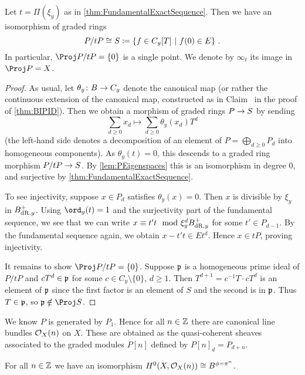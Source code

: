 \begin{cor}\label{cor:P/tPpoint}
	Let $t=\Pi(\xi_y)$ as in \cref{thm:FundamentalExactSequence}. Then we have an isomorphism of graded rings
	\begin{equation*}
		P/tP\cong S\coloneqq\left\{f\in C_y[T]\ \middle|\  f(0)\in E\right\}\,.
	\end{equation*}
	In particular, $\Proj P/tP=\{0\}$ is a single point. We denote by $\infty_t$ its image in $\Proj P=X$.
\end{cor}
\begin{proof}
	As usual, let $\theta_y\colon B\morphism C_y$ denote the canonical map (or rather the continuous extension of the canonical map, constructed as in Claim~ in the proof of \cref{thm:BIPID}). Then we obtain a morphism of graded rings $P\morphism S$ by sending
	\begin{equation*}
		\sum_{d\geq 0}x_d\longmapsto \sum_{d\geq 0}\theta_y(x_d)T^d
	\end{equation*}
	(the left-hand side denotes a decomposition of an element of $P=\bigoplus_{d\geq 0}P_d$ into homogeneous components). As $\theta_y(t)=0$, this descends to a graded ring morphism $P/tP\morphism S$. By \cref{lem:PEigenspaces} this is an isomorphism in degree $0$, and surjective by \cref{thm:FundamentalExactSequence}.
	
	To see injectivity, suppose $x\in P_d$ satisfies $\theta_y(x)=0$. Then $x$ is divisible by $\xi_y$ in $B_{\mathrm{dR},y}^+$. Using $\ord_y(t)=1$ and the surjectivity part of the fundamental sequence, we see that we can write $x\equiv t't\mod \xi_y^dB_{\mathrm{dR},y}^+$ for some $t'\in P_{d-1}$. By the fundamental sequence again, we obtain $x-t't\in Et^d$. Hence $x\in tP$, proving injectivity.
	
	It remains to show $\Proj P/tP=\{0\}$. Suppose $\mathfrak{p}$ is a homogeneous prime ideal of $P/tP$ and $cT^d\in \mathfrak{p}$ for some $c\in C_y\setminus\{0\}$, $d\geq 1$. Then $T^{d+1}=c^{-1}T\cdot cT^d$ is an element of $\mathfrak{p}$ since the first factor is an element of $S$ and the second is in $\mathfrak{p}$. Thus $T\in \mathfrak{p}$, so $\pp\notin \Proj S$.
\end{proof}
We know $P$ is generated by $P_1$. Hence for all $n\in \mathbb{Z}$ there are canonical line bundles $\mathcal{O}_X(n)$ on $X$. These are obtained as the quasi-coherent sheaves associated to the graded modules $P[n]$ defined by $P[n]_d=P_{d+n}$.
\begin{lem}\label{lem:HiOXn}
	For all $n\in \mathbb{Z}$ we have an isomorphism $H^0(X,\Oo_X(n))\cong B^{\phi=\pi^n}$.
\end{lem}
